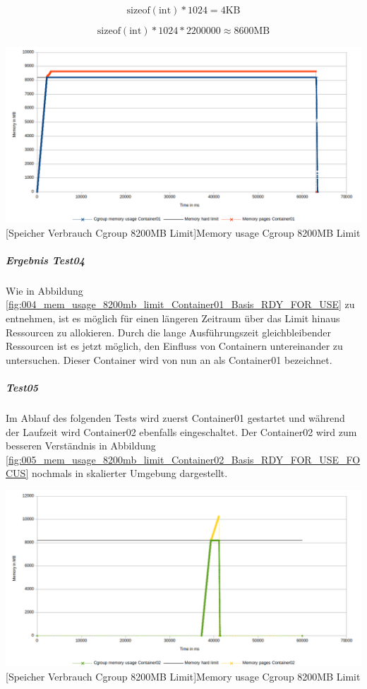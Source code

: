 \[\mathrm{sizeof(int)} * 1024 = 4 \mathrm{KB}\]

\[\mathrm{sizeof(int)} * 1024 * 2200000 \approx 8600 \mathrm{MB}\]


\vspace{1em}
\begin{minipage}{\linewidth}
	\centering
	\includegraphics[width=1\linewidth]{pics/004_mem_usage_8200mb_limit_Container01_Basis_RDY_FOR_USE.png}
	[Speicher Verbrauch Cgroup 8200MB Limit]{Memory usage Cgroup 8200MB Limit}
	\label{fig:004_mem_usage_8200mb_limit_Container01_Basis_RDY_FOR_USE}
\end{minipage}

\subparagraph{Ergebnis Test04}
Wie in Abbildung \ref{fig:004_mem_usage_8200mb_limit_Container01_Basis_RDY_FOR_USE} zu entnehmen, ist es möglich für einen längeren Zeitraum über das Limit hinaus Ressourcen zu allokieren. Durch die lange Ausführungszeit gleichbleibender Ressourcen ist es jetzt möglich, den Einfluss von Containern untereinander zu untersuchen. Dieser Container wird von nun an als Container01 bezeichnet.

\subparagraph{Test05}
Im Ablauf des folgenden Tests wird zuerst Container01 gestartet und während der Laufzeit wird Container02 ebenfalls eingeschaltet. Der Container02 wird zum besseren Verständnis in Abbildung \ref{fig:005_mem_usage_8200mb_limit_Container02_Basis_RDY_FOR_USE_FOCUS} nochmals in skalierter Umgebung dargestellt. 


\vspace{1em}
\begin{minipage}{\linewidth}
	\centering
	\includegraphics[width=1\linewidth]{pics/005_mem_usage_8200mb_limit_Container02_Basis_RDY_FOR_USE_FOCUS.png}
	[Speicher Verbrauch Cgroup 8200MB Limit]{Memory usage Cgroup 8200MB Limit}
	\label{fig:005_mem_usage_8200mb_limit_Container02_Basis_RDY_FOR_USE_FOCUS}
\end{minipage}

